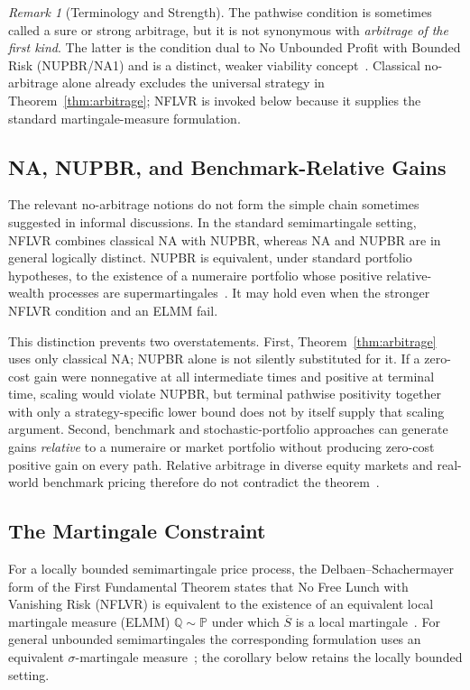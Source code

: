 \documentclass[aps,pra,reprint,superscriptaddress,amsmath,amssymb,floatfix]{revtex4-2}
\theoremstyle{plain}
\theoremstyle{definition}
\theoremstyle{remark}
\newtheorem{remark}{Remark}
\begin{document}
\begin{remark}[Terminology and Strength]
The pathwise condition is sometimes called a sure or strong arbitrage, but it
is not synonymous with \emph{arbitrage of the first kind}. The latter is the
condition dual to No Unbounded Profit with Bounded Risk (NUPBR/NA1) and is a
distinct, weaker viability concept~\cite{Kardaras2012}. Classical
no-arbitrage alone already excludes the universal strategy in
Theorem~\ref{thm:arbitrage}; NFLVR is invoked below because it supplies the
standard martingale-measure formulation.
\end{remark}

\subsection{NA, NUPBR, and Benchmark-Relative Gains}

The relevant no-arbitrage notions do not form the simple chain sometimes
suggested in informal discussions. In the standard semimartingale setting,
NFLVR combines classical NA with NUPBR, whereas NA and NUPBR are in general
logically distinct. NUPBR is equivalent, under standard portfolio hypotheses,
to the existence of a numeraire portfolio whose positive relative-wealth
processes are supermartingales~\cite{KaratzasKardaras2007,Kardaras2012}.
It may hold even when the stronger NFLVR condition and an ELMM fail.

This distinction prevents two overstatements. First, Theorem~\ref{thm:arbitrage}
uses only classical NA; NUPBR alone is not silently substituted for it. If a
zero-cost gain were nonnegative at all intermediate times and positive at
terminal time, scaling would violate NUPBR, but terminal pathwise positivity
together with only a strategy-specific lower bound does not by itself supply
that scaling argument. Second, benchmark and stochastic-portfolio approaches
can generate gains \emph{relative} to a numeraire or market portfolio without
producing zero-cost positive gain on every path. Relative arbitrage in diverse
equity markets and real-world benchmark pricing therefore do not contradict
the theorem~\cite{FernholzKaratzasKardaras2005,PlatenHeath2010}.

\subsection{The Martingale Constraint}

For a locally bounded semimartingale price process, the
Delbaen--Schachermayer form of the First Fundamental Theorem states that No
Free Lunch with Vanishing Risk (NFLVR) is equivalent to the existence of an
equivalent local martingale measure (ELMM)
\(\mathbb{Q}\sim\mathbb{P}\) under which \(\overline S\) is a local
martingale~\cite{Harrison1981,Delbaen1994}. For general unbounded
semimartingales the corresponding formulation uses an equivalent
\(\sigma\)-martingale measure~\cite{DelbaenSchachermayer1998}; the corollary below
retains the locally bounded setting.
\end{document}
